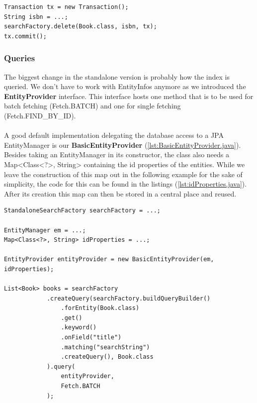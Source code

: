 \lstset{language=java}
\begin{lstlisting}[frame=htrbl, caption={Deleting an object by id with the standalone version}, label={lst:deleting_object_native.java}]
Transaction tx = new Transaction();
String isbn = ...;
searchFactory.delete(Book.class, isbn, tx);
tx.commit();
\end{lstlisting}

\pagebreak

\subsubsection{Queries} \label{querying_standalone}
The biggest change in the standalone version is probably how the index is queried. We don't have to work with EntityInfos anymore as we introduced the \textbf{EntityProvider} interface. This interface hosts one method that is to be used for batch fetching (Fetch.BATCH) and one for single fetching (Fetch.FIND\_BY\_ID).
\\\\
A good default implementation delegating the database access to a JPA EntityManager is our \textbf{BasicEntityProvider} (\ref{lst:BasicEntityProvider.java}). Besides taking an EntityManager in its constructor, the class also needs a Map<Class<?>, String> containing the id properties of the entities. While we leave the construction of this map out in the following example for the sake of simplicity, the code for this can be found in the listings (\ref{lst:idProperties.java}). After its creation this map can then be stored in a central place and reused.
\\
\lstset{language=java}
\begin{lstlisting}[frame=htrbl, caption={Querying the index with the standalone version}, label={lst:querying_natively.java}]
StandaloneSearchFactory searchFactory = ...;

EntityManager em = ...;
Map<Class<?>, String> idProperties = ...;

EntityProvider entityProvider = new BasicEntityProvider(em, idProperties);

List<Book> books = searchFactory
			.createQuery(searchFactory.buildQueryBuilder()
				.forEntity(Book.class)
				.get()
				.keyword()
				.onField("title")
				.matching("searchString")
				.createQuery(), Book.class
			).query(
				entityProvider,
				Fetch.BATCH
			);
\end{lstlisting}

\pagebreak

